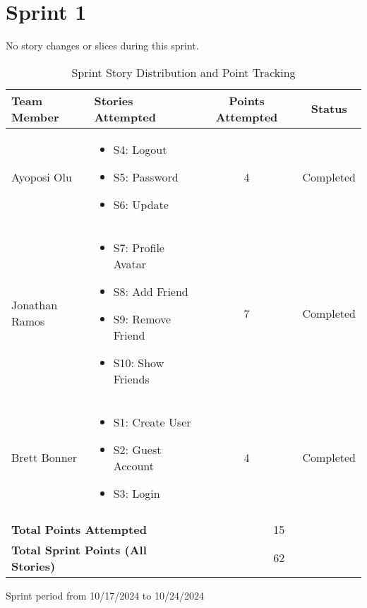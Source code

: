 \documentclass[12pt]{article} %
\begin{document}
\section {Sprint 1}
\begin{table}[h]
\centering
No story changes or slices during this sprint.

\caption{Sprint Story Distribution and Point Tracking}
\begin{tabular}{|p{3cm}|p{6cm}|c|c|}
\hline
\textbf{Team Member} & \textbf{Stories Attempted} & \textbf{Points Attempted} & \textbf{Status} \\
\hline
Ayoposi Olu & 
\begin{itemize}
    \item S4: Logout
    \item S5: Password
    \item S6: Update
\end{itemize} & 
4 & 
Completed \\
\hline
Jonathan Ramos & 
\begin{itemize}
    \item S7: Profile Avatar
    \item S8: Add Friend
    \item S9: Remove Friend
    \item S10: Show Friends
\end{itemize}& 
7 & 
Completed \\
\hline
Brett Bonner & 
\begin{itemize}
    \item S1: Create User
    \item S2: Guest Account
    \item S3: Login
\end{itemize} & 
4 & 
Completed \\
\hline
\multicolumn{4}{|c|}{} \\
\hline
\multicolumn{2}{|l|}{\textbf{Total Points Attempted}} & \multicolumn{2}{c|}{15} \\
\hline
\multicolumn{2}{|l|}{\textbf{Total Sprint Points (All Stories)}} & \multicolumn{2}{c|}{62} \\
\hline
\end{tabular}

\vspace{0.5cm}
\begin{center}
\small{Sprint period from 10/17/2024 to 10/24/2024}
\end{center}
\end{table}
\end{document}
